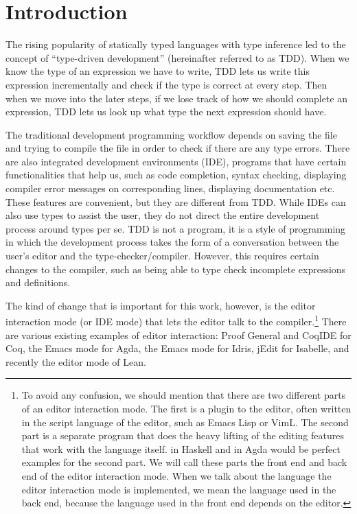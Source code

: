 \section{Introduction} \label{sec:introduction}

The rising popularity of statically typed languages with type inference led to
the concept of ``type-driven development'' (hereinafter referred to as TDD).
When we know the type of an expression we have to write, TDD lets us write this
expression incrementally and check if the type is correct at every step.  Then
when we move into the later steps, if we lose track of how we should complete
an expression, TDD lets us look up what type the next expression should have.

The traditional development programming workflow depends on saving the
file and trying to compile the file in order to check if there are any type
errors. There are also integrated development environments (IDE), programs that have
certain functionalities that help us, such as code completion, syntax checking,
displaying compiler error messages on corresponding lines, displaying
documentation etc.  These features are convenient, but they are different from
TDD. While IDEs can also use types to assist the user, they do not direct the
entire development process around types per se. TDD is not a program, it is a
style of programming in which the development process takes the form of a
conversation between the user's editor and the type-checker/compiler. However,
this requires certain changes to the compiler, such as being able to type check
incomplete expressions and definitions.\cite{tdd}

The kind of change that is important for this work, however, is the editor
interaction mode (or IDE mode) that lets the editor
talk to the compiler.\footnote{To avoid any confusion, we should mention that
  there are two different parts of an editor interaction mode. The first is a
  plugin to the editor, often written in the script language of the editor,
  such as Emacs Lisp or VimL. The second part is a separate program that does
  the heavy lifting of the editing features that work with the language
  itself.   in Haskell and  in Agda would be
  perfect examples for the second part. We will call these parts the front
  end and back end of the editor interaction mode. When we talk about the
  language the editor interaction mode is implemented, we mean the language
  used in the back end, because the language used in the front end
  depends on the editor.}
There are various existing examples of editor interaction:
Proof General\cite{pg} and CoqIDE for Coq\cite{coq},
the Emacs mode\cite{agdamode} for Agda\cite{agda},
the Emacs mode\cite{idrismode} for Idris\cite{idris},
jEdit\cite{isabellejedit} for Isabelle\cite{isabelle},
and recently the editor mode of Lean\cite{lean}.

